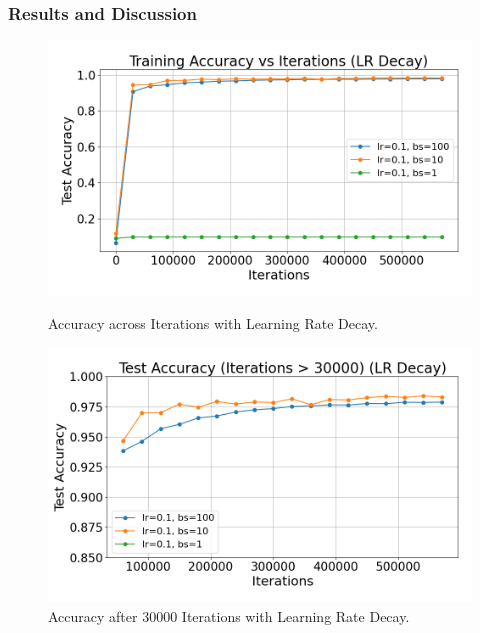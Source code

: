 \subsubsection{Results and Discussion}
\begin{figure}[h]
    \centering
    \begin{minipage}[b]{0.45\textwidth}
        \centering
        \includegraphics[width=\linewidth]{../data/part2/learning_rate_decay/accuracy_training_plot_lr_decay}
        \caption{Accuracy across Iterations with Learning Rate Decay.}
        \label{fig:training_lr_decay}
    \end{minipage}
    \hfill
    \begin{minipage}[b]{0.45\textwidth}
        \centering
        \includegraphics[width=\linewidth]{../data/part2/learning_rate_decay/accuracy_after_30000_plot_lr_decay}
        \caption{Accuracy after 30000 Iterations with Learning Rate Decay.}
        \label{fig:30000_lr_decay}
    \end{minipage}
\end{figure}


